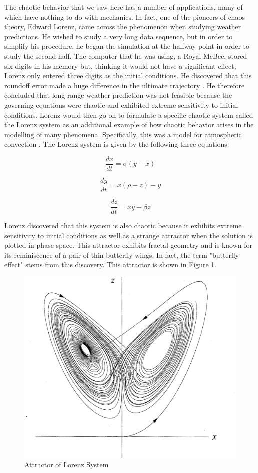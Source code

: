 \documentclass[twocolumn,amsmath,amssymb,pra, floatfix]{revtex4-2}
\begin{document}
The chaotic behavior that we saw here has a number of applications, many of which have nothing to do with mechanics. In fact, one of the pioneers of chaos theory, Edward Lorenz, came across the phenomenon when studying weather predictions. He wished to study a very long data sequence, but in order to simplify his procedure, he began the simulation at the halfway point in order to study the second half. The computer that he was using, a Royal McBee, stored six digits in his memory but, thinking it would not have a significant effect, Lorenz only entered three digits as the initial conditions. He discovered that this roundoff error made a huge difference in the ultimate trajectory \cite{History}. He therefore concluded that long-range weather prediction was not feasible because the governing equations were chaotic and exhibited extreme sensitivity to initial conditions\cite{weather}. 
Lorenz would then go on to formulate a specific chaotic system called the Lorenz system as an additional example of how chaotic behavior arises in the modelling of many phenomena. Specifically, this was a model for atmospheric convection \cite{weather}. The Lorenz system is given by the following three equations:

\begin{equation}
    \frac{dx}{dt} = \sigma(y-x)
\end{equation}

\begin{equation}
    \frac{dy}{dt} = x(\rho - z) - y
\end{equation}

\begin{equation}
    \frac{dz}{dt} = xy - \beta z
\end{equation}

Lorenz discovered that this system is also chaotic because it exhibits extreme sensitivity to initial conditions as well as a strange attractor when the solution is plotted in phase space. This attractor exhibits fractal geometry and is known for its reminiscence of a pair of thin butterfly wings. In fact, the term "butterfly effect" stems from this discovery. This attractor is shown in Figure \ref{fig: Attractor of Lorenz system}.  

\begin{figure}[H]
    \centering
    \includegraphics[width = 0.7\linewidth]{images/Butterfly curve.png}
    \caption{Attractor of Lorenz System}
    \label{fig: Attractor of Lorenz system}
\end{figure}
\end{document}
